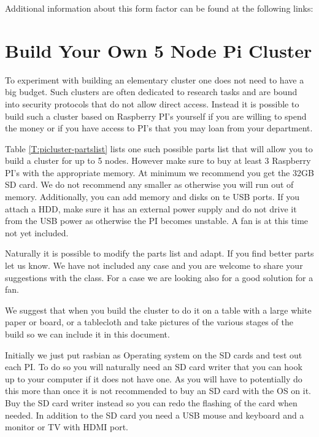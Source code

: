 Additional information about this form factor can be found at the
following links:




\section{Build Your Own 5 Node Pi Cluster}\label{s:pi5}

To experiment with building an elementary cluster one does not need to
have a big budget. Such clusters are often dedicated to research tasks
and are bound into security protocols that do not allow direct
access. Instead it is possible to build such a cluster based on
Raspberry PI's yourself if you are willing to spend the money or if
you have access to PI's that you may loan from your department.

Table \ref{T:picluster-partslist} lists one such possible parts list
that will allow you to build a cluster for up to 5 nodes. However make
sure to buy at least 3 Raspberry PI's with the appropriate memory. At
minimum we recommend you get the 32GB SD card. We do not recommend any
smaller as otherwise you will run out of memory. Additionally, you can
add memory and disks on te USB ports. If you attach a HDD, make sure
it has an external power supply and do not drive it from the USB power
as otherwise the PI becomes unstable.  A fan is at this time not yet
included.

Naturally it is possible to modify the parts list and adapt. If you
find better parts let us know. We have not included any case and you
are welcome to share your suggestions with the class. For a case we
are looking also for a good solution for a fan.

We suggest that when you build the cluster to do it on a table with a
large white paper or board, or a tablecloth and take pictures of the
various stages of the build so we can include it in this document.

Initially we just put rasbian as Operating system on the SD cards and
test out each PI. To do so you will naturally need an SD card writer
that you can hook up to your computer if it does not have one. As you
will have to potentially do this more than once it is not recommended
to buy an SD card with the OS on it. Buy the SD card writer instead so
you can redo the flashing of the card when needed. In addition to the
SD card you need a USB mouse and keyboard and a monitor or TV with
HDMI port.

